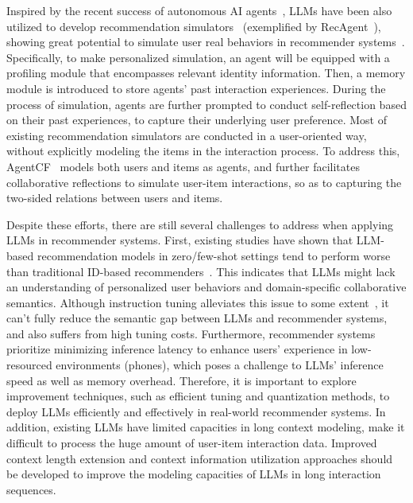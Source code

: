 { 
{Inspired by the recent success of autonomous AI agents~\cite{wang-arxiv-2023-a}, LLMs have been also utilized to develop recommendation simulators~\cite{Wang-arxiv-2023-RecAgent, Ie-arxiv-2019-recsim} (exemplified by RecAgent~\cite{Wang-arxiv-2023-RecAgent}), showing  great potential to simulate user real behaviors in recommender systems~\cite{Wang-arxiv-2023-RecAgent, Zhang-arxiv-2023-AgentCF, zhang-arxiv-2023-on}.   
Specifically, to make  personalized simulation, an agent will be equipped with a profiling module that encompasses relevant identity information.  Then, a memory module is introduced to store agents' past interaction experiences.  
During the process of simulation, agents are further prompted to conduct self-reflection based on their past experiences, to capture their underlying user preference.  
Most of existing recommendation simulators are conducted in a user-oriented way, without explicitly modeling the items in the interaction process.  
To address this, AgentCF~\cite{Zhang-arxiv-2023-AgentCF} models both users and items as agents,  and further facilitates collaborative reflections to simulate user-item interactions, so as to capturing the two-sided relations between users and items.}
 








{
Despite these efforts, there are still several challenges to address when applying LLMs in recommender systems. First, existing studies have shown that LLM-based  recommendation models in zero/few-shot settings tend to perform worse than traditional ID-based recommenders~\cite{hou-arxiv-2023-large, dai-recsys-2023-uncovering}. This indicates that LLMs might lack an understanding of personalized user behaviors and domain-specific collaborative semantics. Although instruction tuning  alleviates this issue to some extent~\cite{bao-recsys-2023-tallrec, Zhang-2023-arxiv-recommendation}, it can't fully reduce the semantic gap between LLMs and recommender systems, and also suffers from high tuning costs.  
Furthermore, recommender systems prioritize minimizing inference latency to enhance users' experience in low-resourced environments (\eg phones), which poses a challenge to LLMs'  inference speed as well as memory overhead. Therefore, it is important to explore  improvement  techniques, such as efficient tuning and quantization methods, to deploy LLMs efficiently and effectively in real-world recommender systems. In addition, existing LLMs
have limited capacities in long context modeling, make it difficult to process the huge amount of user-item interaction data. Improved context length  extension and context information utilization approaches should be developed to improve the modeling capacities of LLMs in long interaction sequences. 
}









}
